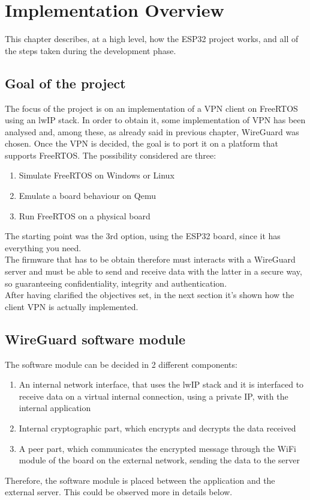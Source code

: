 \chapter{Implementation Overview}
This chapter describes, at a high level, how the ESP32 project works, and all of the steps taken during the development phase.

\section{Goal of the project}\label{projectgoal}

The focus of the project is on an implementation of a VPN client on FreeRTOS using an lwIP stack. 
In order to obtain it, some implementation of VPN has been analysed and, among these, as already said in previous chapter, WireGuard was chosen.
Once the VPN is decided, the goal is to port it on a platform that supports FreeRTOS. The possibility considered are three:
\begin{enumerate}
    \item Simulate FreeRTOS on Windows or Linux
    \item Emulate a board behaviour on Qemu
    \item Run FreeRTOS on a physical board
\end{enumerate} 
The starting point was the 3rd option, using the ESP32 board, since it has everything you need.\\
The firmware that has to be obtain therefore must interacts with a WireGuard server and must be able to send and receive data with the latter in a secure way, so guaranteeing confidentiality, integrity and authentication.\\
After having clarified the objectives set, in the next section it's shown how the client VPN is actually implemented.

\section{WireGuard software module}

The software module can be decided in 2 different components:
\begin{enumerate}
\item An internal network interface, that uses the lwIP stack and it is interfaced to receive data on a virtual internal connection, using a private IP, with the internal application
\item Internal cryptographic part, which encrypts and decrypts the data received
\item A peer part, which communicates the encrypted message through the WiFi module of the board on the external network, sending the data to the server
\end{enumerate} 
Therefore, the software module is placed between the application and the external server. This could be observed more in details below.

